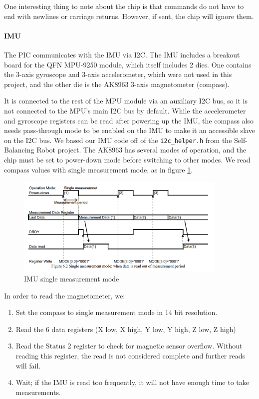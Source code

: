 \documentclass[]{article}
\let\oldparagraph\paragraph
\renewcommand{\paragraph}[1]{\oldparagraph{#1}\mbox{}}
\begin{document}
One interesting thing to note about the chip is that commands do not
have to end with newlines or carriage returns. However, if sent, the
chip will ignore them.

\paragraph{IMU}

The PIC communicates with the IMU via I2C.
The IMU includes a breakout board for the QFN MPU-9250 \cite{mpu9250datasheet} \cite{mpu9250regmap} module, which itself includes 2 dies.
One contains the 3-axis gyroscope and 3-axis accelerometer, which were not
used in this project, and the other die is the AK8963 3-axis
magnetometer (compass). \cite{ak8963cdatasheet}

It is connected to the rest of the MPU module via an auxiliary I2C bus,
so it is not connected to the MPU's main I2C bus by default. While the
accelerometer and gyroscope registers can be read after powering up the
IMU, the compass also needs pass-through mode to be enabled on the IMU
to make it an accessible slave on the I2C bus. We based our IMU code off of the \texttt{i2c\_helper.h} from the Self-Balancing Robot project. \cite{selfbalancingrobot} The AK8963 has several modes
of operation, and the chip must be set to power-down mode before
switching to other modes. We read compass values with single measurement
mode, as in figure \ref{fig:imu_single_measurement}.

\begin{figure}
  \centering
  \includegraphics[width=0.9\textwidth]{imu_single_measurement.png}
  \caption{IMU single measurement mode}
  \label{fig:imu_single_measurement}
\end{figure}

In order to read the magnetometer, we:
\begin{enumerate}
\item
  Set the compass to single measurement mode in 14 bit resolution.
\item
  Read the 6 data registers (X low, X high, Y low, Y high, Z low, Z
  high)
\item
  Read the Status 2 register to check for magnetic sensor overflow.
  Without reading this register, the read is not considered complete and
  further reads will fail.
\item
  Wait; if the IMU is read too frequently, it will not have enough time
  to take measurements.
\end{enumerate}
\end{document}
